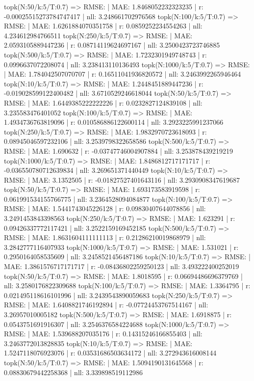 topk(N:50/k:5/T:0.7) => RMSE: | MAE: 1.8468052232323235 | r: -0.00025515273784747417 | nll: 3.248661702976568
topk(N:100/k:5/T:0.7) => RMSE: | MAE: 1.6261884070351758 | r: 0.0859252234554263 | nll: 4.234612984766511
topk(N:250/k:5/T:0.7) => RMSE: | MAE: 2.0593105889447236 | r: 0.08714119624697167 | nll: 3.2500423723746885
topk(N:500/k:5/T:0.7) => RMSE: | MAE: 1.7232301949748743 | r: 0.0996637072208074 | nll: 3.238413110136493
topk(N:1000/k:5/T:0.7) => RMSE: | MAE: 1.784042507070707 | r: 0.16511041936820572 | nll: 3.2463992265946464
topk(N:10/k:5/T:0.7) => RMSE: | MAE: 1.2448451889447236 | r: -0.019028599122400482 | nll: 3.6710529246618044
topk(N:50/k:5/T:0.7) => RMSE: | MAE: 1.6449385222222226 | r: 0.0232827124839108 | nll: 3.235583476401052
topk(N:100/k:5/T:0.7) => RMSE: | MAE: 1.4934736763819096 | r: 0.010586886122600114 | nll: 3.2923225991237066
topk(N:250/k:5/T:0.7) => RMSE: | MAE: 1.9832970723618093 | r: 0.08945046597232106 | nll: 3.2539798322658586
topk(N:500/k:5/T:0.7) => RMSE: | MAE: 1.690632 | r: -0.03747746004907884 | nll: 3.253878439219219
topk(N:1000/k:5/T:0.7) => RMSE: | MAE: 1.8486812717171717 | r: -0.036550780712639834 | nll: 3.269651371440449
topk(N:10/k:5/T:0.7) => RMSE: | MAE: 3.1352505 | r: -0.01827527401643116 | nll: 3.2930908347619687
topk(N:50/k:5/T:0.7) => RMSE: | MAE: 1.693173583919598 | r: 0.061991534155766775 | nll: 3.2364528094084877
topk(N:100/k:5/T:0.7) => RMSE: | MAE: 1.5441743045226128 | r: 0.09830407644078856 | nll: 3.2491453843398563
topk(N:250/k:5/T:0.7) => RMSE: | MAE: 1.623291 | r: 0.09426337772117421 | nll: 3.2522159169452185
topk(N:500/k:5/T:0.7) => RMSE: | MAE: 1.8631604111111113 | r: 0.21286210019868979 | nll: 3.2842777116407933
topk(N:1000/k:5/T:0.7) => RMSE: | MAE: 1.531021 | r: 0.2950164058535609 | nll: 3.2458521456487186
topk(N:10/k:5/T:0.7) => RMSE: | MAE: 1.3861576717171717 | r: -0.08436802259250123 | nll: 3.493222400252019
topk(N:50/k:5/T:0.7) => RMSE: | MAE: 1.8018595 | r: 0.06694486696379769 | nll: 3.2580176822309688
topk(N:100/k:5/T:0.7) => RMSE: | MAE: 1.3364795 | r: 0.021495118616101996 | nll: 3.2439543890059683
topk(N:250/k:5/T:0.7) => RMSE: | MAE: 1.6408821746192894 | r: -0.07724453767514167 | nll: 3.26957010005182
topk(N:500/k:5/T:0.7) => RMSE: | MAE: 1.6918875 | r: 0.0543751691916307 | nll: 3.2546376584224688
topk(N:1000/k:5/T:0.7) => RMSE: | MAE: 1.539688207035176 | r: 0.14315246166855403 | nll: 3.2463772013828835
topk(N:10/k:5/T:0.7) => RMSE: | MAE: 1.5247118076923076 | r: 0.03531686503634172 | nll: 3.272943616008144
topk(N:50/k:5/T:0.7) => RMSE: | MAE: 1.5094190131645568 | r: 0.08830679442258368 | nll: 3.339898519112986
